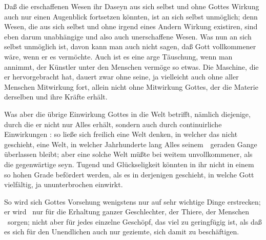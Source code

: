 \begin{aufzb}
\item Daß die erschaffenen Wesen ihr Daseyn aus sich selbst und ohne Gottes Wirkung auch nur einen Augenblick fortsetzen könnten, ist an sich selbst unmöglich; denn Wesen, die aus sich selbst und ohne irgend eines Andern Wirkung existiren, sind eben darum unabhängige und also auch unerschaffene Wesen. Was nun an sich selbst unmöglich ist, davon kann man auch nicht sagen, daß Gott vollkommener wäre, wenn er es vermöchte. Auch ist es eine arge Täuschung, wenn man annimmt, der Künstler unter den Menschen vermöge so etwas. Die Maschine, die er hervorgebracht hat, dauert zwar ohne seine, ja vielleicht auch ohne aller Menschen Mitwirkung fort, allein nicht ohne Mitwirkung Gottes, der die Materie derselben und ihre Kräfte erhält.
\item Was aber die übrige Einwirkung Gottes in die Welt betrifft, nämlich diejenige, durch die er nicht nur Alles erhält, sondern auch durch continuirliche Einwirkungen : so ließe sich freilich eine Welt denken, in welcher das nicht geschieht, eine Welt, in welcher Jahrhunderte lang Alles seinem~\ geraden Gange überlassen bleibt; aber eine solche Welt müßte bei weitem unvollkommener, als die gegenwärtige seyn. Tugend und Glückseligkeit könnten in ihr nicht in einem so hohen Grade befördert werden, als es in derjenigen geschieht, in welche Gott vielfältig, ja ununterbrochen einwirkt.
\end{aufzb}\par
{} So wird sich Gottes Vorsehung wenigstens nur auf sehr wichtige Dinge erstrecken; er wird \zB\ nur für die Erhaltung ganzer Geschlechter, der Thiere, der Menschen \usw\ sorgen; nicht aber für jedes einzelne Geschöpf, das viel zu geringfügig ist, als daß es sich für den Unendlichen auch nur geziemte, sich damit zu beschäftigen.\par
{} 
